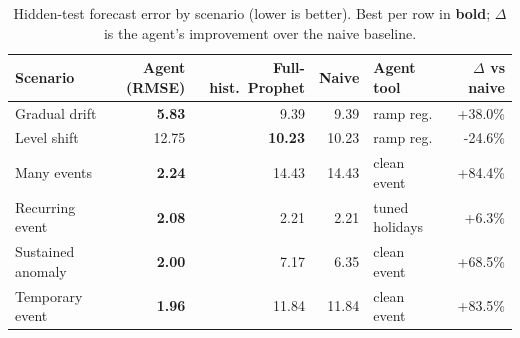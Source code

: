 \begin{table}[t]
  \centering
  \caption{Hidden-test forecast error by scenario (lower is better). Best per row in \textbf{bold}; $\Delta$ is the agent's improvement over the naive baseline.}
  \label{tab:results}
  \small
  \begin{tabular}{l r r r l r}
    \toprule
    Scenario & Agent (RMSE) & Full-hist.\ Prophet & Naive & Agent tool & $\Delta$ vs naive \\
    \midrule
    Gradual drift & \textbf{5.83} & 9.39 & 9.39 & ramp reg. & +38.0\% \\
    Level shift & 12.75 & \textbf{10.23} & 10.23 & ramp reg. & -24.6\% \\
    Many events & \textbf{2.24} & 14.43 & 14.43 & clean event & +84.4\% \\
    Recurring event & \textbf{2.08} & 2.21 & 2.21 & tuned holidays & +6.3\% \\
    Sustained anomaly & \textbf{2.00} & 7.17 & 6.35 & clean event & +68.5\% \\
    Temporary event & \textbf{1.96} & 11.84 & 11.84 & clean event & +83.5\% \\
    \bottomrule
  \end{tabular}
\end{table}
